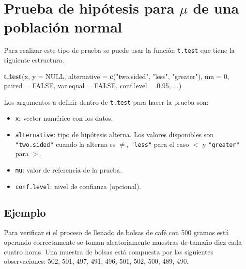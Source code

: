 \documentclass[10pt,]{krantz}
\makeatletter
\newenvironment{Shaded}{\begin{snugshade}}{\end{snugshade}}
\newcommand{\KeywordTok}[1]{\textcolor[rgb]{0.13,0.29,0.53}{\textbf{{#1}}}}
\newcommand{\DataTypeTok}[1]{\textcolor[rgb]{0.13,0.29,0.53}{{#1}}}
\newcommand{\DecValTok}[1]{\textcolor[rgb]{0.00,0.00,0.81}{{#1}}}
\newcommand{\FloatTok}[1]{\textcolor[rgb]{0.00,0.00,0.81}{{#1}}}
\newcommand{\StringTok}[1]{\textcolor[rgb]{0.31,0.60,0.02}{{#1}}}
\newcommand{\OtherTok}[1]{\textcolor[rgb]{0.56,0.35,0.01}{{#1}}}
\newcommand{\NormalTok}[1]{{#1}}
\providecommand{\tightlist}{%
  \setlength{\itemsep}{0pt}\setlength{\parskip}{0pt}}
\newenvironment{kframe}{%
\medskip{}
\setlength{\fboxsep}{.8em}
 \def\at@end@of@kframe{}%
 \ifinner\ifhmode%
  \def\at@end@of@kframe{\end{minipage}}%
  \begin{minipage}{\columnwidth}%
 \fi\fi%
 \def\FrameCommand##1{\hskip\@totalleftmargin \hskip-\fboxsep
 \colorbox{shadecolor}{##1}\hskip-\fboxsep
     \hskip-\linewidth \hskip-\@totalleftmargin \hskip\columnwidth}%
 \MakeFramed {\advance\hsize-\width
   \@totalleftmargin\z@ \linewidth\hsize
   \@setminipage}}%
 {\par\unskip\endMakeFramed%
 \at@end@of@kframe}
\renewenvironment{Shaded}{\begin{kframe}}{\end{kframe}}
\makeatother
\begin{document}
\section{\texorpdfstring{Prueba de hipótesis para \(\mu\) de una
población
normal}{Prueba de hipótesis para \textbackslash{}mu de una población normal}}\label{prueba-de-hipotesis-para-mu-de-una-poblacion-normal}

Para realizar este tipo de prueba se puede usar la función
\texttt{t.test} que tiene la siguiente estructura.

\begin{Shaded}
\begin{Highlighting}[]
\KeywordTok{t.test}\NormalTok{(x, }\DataTypeTok{y =} \OtherTok{NULL}\NormalTok{,}
       \DataTypeTok{alternative =} \KeywordTok{c}\NormalTok{(}\StringTok{"two.sided"}\NormalTok{, }\StringTok{"less"}\NormalTok{, }\StringTok{"greater"}\NormalTok{),}
       \DataTypeTok{mu =} \DecValTok{0}\NormalTok{, }\DataTypeTok{paired =} \OtherTok{FALSE}\NormalTok{, }\DataTypeTok{var.equal =} \OtherTok{FALSE}\NormalTok{,}
       \DataTypeTok{conf.level =} \FloatTok{0.95}\NormalTok{, ...)}
\end{Highlighting}
\end{Shaded}

Los argumentos a definir dentro de \texttt{t.test} para hacer la prueba
son:

\begin{itemize}
\tightlist
\item
  \texttt{x}: vector numérico con los datos.
\item
  \texttt{alternative}: tipo de hipótesis alterna. Los valores
  disponibles son \texttt{"two.sided"} cuando la alterna es \(\neq\),
  \texttt{"less"} para el caso \(<\) y \texttt{"greater"} para \(>\).
\item
  \texttt{mu}: valor de referencia de la prueba.
\item
  \texttt{conf.level}: nivel de confianza (opcional).
\end{itemize}

\subsection*{Ejemplo}\label{ejemplo-61}


Para verificar si el proceso de llenado de bolsas de café con 500 gramos
está operando correctamente se toman aleatoriamente muestras de tamaño
diez cada cuatro horas. Una muestra de bolsas está compuesta por las
siguientes observaciones: 502, 501, 497, 491, 496, 501, 502, 500, 489,
490.
\end{document}
